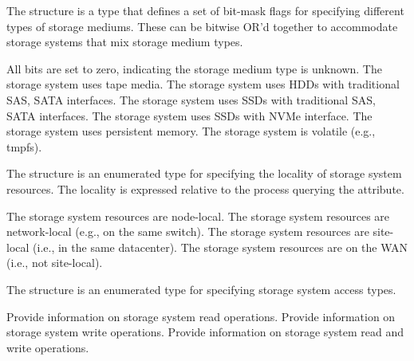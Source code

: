 
The  structure is a  type that defines a set of bit-mask flags for specifying different types of storage mediums. These can be bitwise OR'd together to accommodate storage systems that mix storage medium types.

\begin{constantdesc}
%
All bits are set to zero, indicating the storage medium type is unknown.
%
The storage system uses tape media.
%
The storage system uses HDDs with traditional SAS, SATA interfaces.
%
The storage system uses SSDs with traditional SAS, SATA interfaces.
%
The storage system uses SSDs with NVMe interface.
%
The storage system uses persistent memory.
%
The storage system is volatile (e.g., tmpfs).
%
\end{constantdesc}


The  structure is an enumerated type for specifying the locality of storage system resources. The locality is expressed relative to the process querying the attribute.

\begin{constantdesc}
%
The storage system resources are node-local.
%
The storage system resources are network-local (e.g., on the same switch).
%
The storage system resources are site-local (i.e., in the same datacenter).
%
The storage system resources are on the WAN (i.e., not site-local).
%
\end{constantdesc}



The  structure is an enumerated type for specifying storage system access types.

\begin{constantdesc}
%
Provide information on storage system read operations.
%
Provide information on storage system write operations.
%
Provide information on storage system read and write operations.
%
\end{constantdesc}


